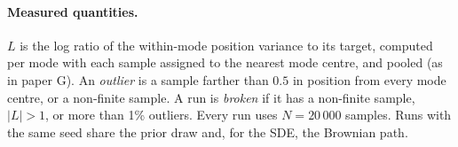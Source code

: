 \paragraph*{Measured quantities.}
$L$ is the log ratio of the within-mode position variance to its target, computed per mode with each sample assigned to the nearest mode centre, and pooled (as in paper G).
An \emph{outlier} is a sample farther than $0.5$ in position from every mode centre, or a non-finite sample.
A run is \emph{broken} if it has a non-finite sample, $|L|>1$, or more than 1\% outliers.
Every run uses $N=20\,000$ samples.
Runs with the same seed share the prior draw and, for the SDE, the Brownian path.
